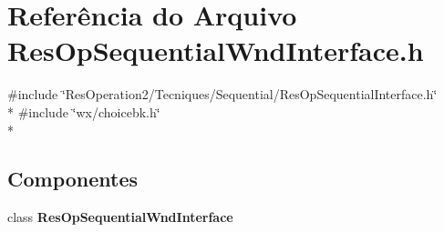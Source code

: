 \section{Referência do Arquivo Res\+Op\+Sequential\+Wnd\+Interface.\+h}
\label{_res_op_sequential_wnd_interface_8h}
{\ttfamily \#include \char`\"{}Res\+Operation2/\+Tecniques/\+Sequential/\+Res\+Op\+Sequential\+Interface.\+h\char`\"{}}\\*
{\ttfamily \#include \char`\"{}wx/choicebk.\+h\char`\"{}}\\*
\subsection*{Componentes}
\begin{DoxyCompactItemize}
\item 
class {\bf Res\+Op\+Sequential\+Wnd\+Interface}
\end{DoxyCompactItemize}
